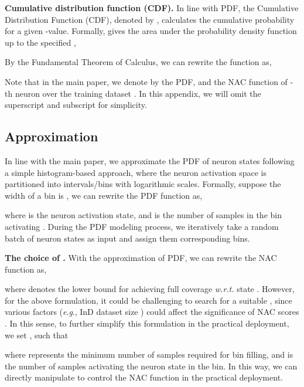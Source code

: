 \documentclass{article} \usepackage{iclr2024_conference,times}
\newcommand{\eg}{\textit{e}.\textit{g}.}
\newcommand{\bfstart}[1]{\noindent\textbf{#1.}}
\begin{document}
\bfstart{Cumulative distribution function (CDF)} In line with PDF, the Cumulative Distribution Function (CDF), denoted by , calculates the cumulative probability for a given -value. Formally,  gives the area under the probability density function up to the specified , 

By the Fundamental Theorem of Calculus, we can rewrite the function  as,



Note that in the main paper, we denote by  the PDF, and  the NAC function of -th neuron over the training dataset . In this appendix, we will omit the superscript  and subscript  for simplicity.

\subsection{Approximation}
\label{Sec:Appendix:Approx}
In line with the main paper, we approximate the PDF of neuron states following a simple histogram-based approach, where the neuron activation space is partitioned into   intervals/bins with logarithmic scales. Formally, suppose the width of a bin is , we can rewrite the PDF function as,

\vspace{-1mm}
where  is the neuron activation state, and  is the number of samples in the bin activating . During the PDF modeling process, we iteratively take a random batch of neuron states as input and assign them corresponding bins.


\bfstart{The choice of }
With the approximation of PDF, we can rewrite the NAC function as,

where  denotes the lower bound for achieving full coverage \textit{w.r.t.} state . 
However, for the above formulation, it could be challenging to search for a suitable , since various factors (\eg, InD dataset size ) could affect the significance of NAC scores .
In this sense, to further simplify this formulation in the practical deployment, we set , such that 

where  represents the minimum number of samples required for bin filling, and  is the number of samples activating the neuron state  in the bin. In this way, we can directly manipulate  to control the NAC function in the practical deployment.
\end{document}
